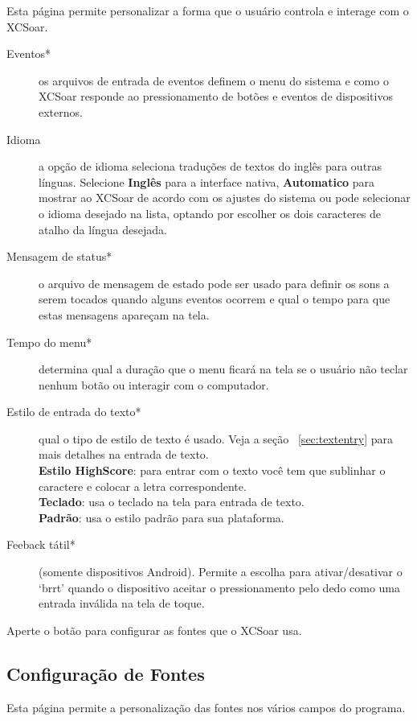 Esta página permite personalizar a forma que o usuário controla e interage com o XCSoar.

\begin{description}
\item[Eventos*]  os arquivos de entrada de eventos definem o menu do sistema e como o XCSoar responde ao pressionamento de botões e eventos de dispositivos externos.
\item[Idioma]  a opção de idioma seleciona traduções de textos do inglês para outras línguas.  Selecione  {\bf Inglês} para a interface nativa, {\bf Automatico}
  para mostrar ao XCSoar de acordo com os ajustes do sistema ou pode selecionar o idioma desejado na lista, optando por escolher os dois caracteres de atalho da língua desejada.
\item[Mensagem de status*]  o arquivo de mensagem de estado pode ser usado para definir os sons a serem tocados quando alguns eventos ocorrem e qual o tempo para que estas mensagens apareçam na tela.
\item[Tempo do menu*]  determina qual a duração que o menu ficará na tela se o usuário não teclar nenhum botão ou interagir com o computador.
\item[Estilo de entrada do texto*]  qual o tipo de estilo de texto é usado.  Veja a seção ~\ref{sec:textentry} para mais detalhes na entrada de texto. \\
  {\bf Estilo HighScore}: para entrar com o texto você tem que sublinhar o caractere e colocar a letra correspondente. \\
  {\bf Teclado}: usa o teclado na tela para entrada de texto. \\
  {\bf Padrão}: usa o estilo padrão para sua plataforma.
\item[Feeback tátil*]  (somente dispositivos Android).  Permite a escolha para ativar/desativar o ‘brrt’ quando o dispositivo aceitar o pressionamento pelo dedo como uma entrada inválida na tela de toque.
\end{description}

Aperte o botão   para configurar as fontes que o XCSoar usa.

\subsection*{Configuração de Fontes}

Esta página permite a personalização das fontes nos vários campos do programa.


